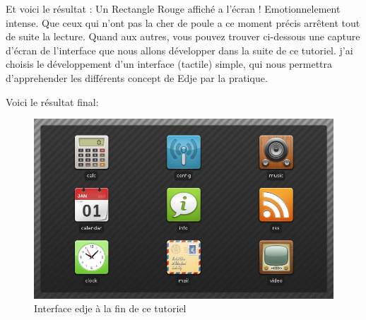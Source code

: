 \documentclass[a4paper]{efr}
\begin{document}
Et voici le résultat : Un Rectangle Rouge affiché a l'écran ! Emotionnelement
intense.
Que ceux qui n'ont pas la cher de poule a ce moment précis arrêtent tout de
suite la lecture. Quand aux autres, vous pouvez trouver ci-dessous une capture
d'écran de l'interface que nous allons développer dans la suite de ce tutoriel.
j'ai choisis le développement d'un interface (tactile) simple, qui nous
permettra d'apprehender les différents concept de Edje par la pratique.

Voici le résultat final:
\begin{figure}
  \begin{center}
    \includegraphics[scale=0.5]{images/screenshot1.png}
  \end{center}
  \caption{Interface edje à la fin de ce tutoriel}
\end{figure}
\end{document}
